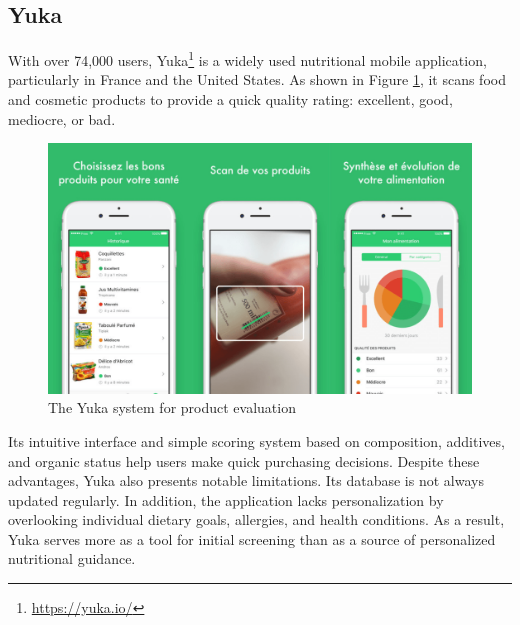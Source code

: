 \subsection{Yuka}
With over 74,000 users, Yuka\footnote{\url{https://yuka.io/}} is a widely used nutritional mobile application, particularly in France and the United States. As shown in Figure \ref{fig:yuka_evaluation}, it scans food and cosmetic products to provide a quick quality rating:
excellent, good, mediocre, or bad.
\begin{center}
\begin{figure}[H]
\includegraphics[scale=0.35]{images/yuka_evaluation.png}
\caption{The Yuka system for product evaluation}
\label{fig:yuka_evaluation}
\end{figure}
\end{center}
\par Its intuitive interface and simple scoring system based on composition,
additives, and organic status help users make quick purchasing decisions.
Despite these advantages, Yuka also presents notable limitations. Its
database is not always updated regularly. In addition, the application
lacks personalization by overlooking individual dietary goals, allergies,
and health conditions. As a result, Yuka serves more as a tool for initial
screening than as a source of personalized nutritional guidance.
